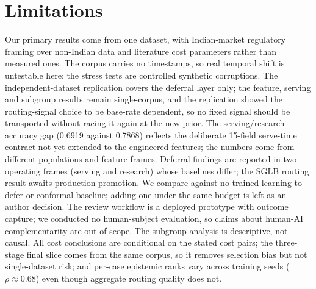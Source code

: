 \documentclass[conference]{IEEEtran}
\begin{document}
\section{Limitations}
Our primary results come from one dataset, with Indian-market regulatory
framing over non-Indian data and literature cost parameters rather than
measured ones. The corpus carries no timestamps, so real temporal shift is
untestable here; the stress tests are controlled synthetic corruptions. The
independent-dataset replication covers the deferral layer only; the
feature, serving and subgroup results remain single-corpus, and the
replication showed the routing-signal choice to be base-rate dependent, so
no fixed signal should be transported without racing it again at the new
prior. The serving/research accuracy gap (0.6919 against 0.7868) reflects
the deliberate 15-field serve-time contract not yet extended to the
engineered features; the numbers come from different populations and
feature frames. Deferral findings are reported in two operating frames
(serving and research) whose baselines differ; the SGLB routing result
awaits production promotion. We compare against no trained
learning-to-defer or conformal baseline; adding one under the same budget
is left as an author decision. The review workflow is a deployed prototype
with outcome capture; we conducted no human-subject evaluation, so claims
about human-AI complementarity are out of scope. The subgroup analysis is
descriptive, not causal. All cost conclusions are conditional on the stated
cost pairs; the three-stage final slice comes from the same corpus, so it
removes selection bias but not single-dataset risk; and per-case epistemic
ranks vary across training seeds ($\rho \approx 0.68$) even though
aggregate routing quality does not.
\end{document}
